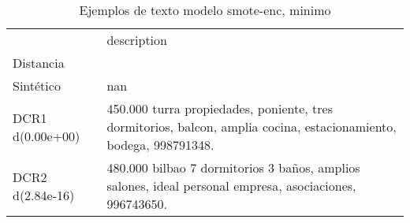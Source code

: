 \begin{table}[H]
\centering
\fontsize{10}{14}\selectfont
\caption{Ejemplos de texto modelo smote-enc, minimo}
\label{table-example-economicos-b-2-smote-enc-min-text}
\begin{tabular}{|l|m{35em}|}
\hline
\rowcolor[gray]{0.8}
 & description \\
Distancia &  \\
\hline Sintético & nan \\
\hline DCR1 d(0.00e+00) & 450.000 turra propiedades, poniente, tres dormitorios, balcon, amplia cocina, estacionamiento, bodega, 998791348. \\
\hline DCR2 d(2.84e-16) & 480.000 bilbao 7 dormitorios 3 ba\~nos, amplios salones, ideal personal empresa, asociaciones, 996743650. \\
\hline
\end{tabular}
\end{table}
